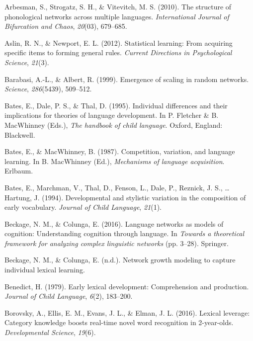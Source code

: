 \documentclass[english,,man,floatsintext]{apa6}
\begin{document}
\leavevmode\hypertarget{ref-arbesman2010}{}%
Arbesman, S., Strogatz, S. H., \& Vitevitch, M. S. (2010). The structure of phonological networks across multiple languages. \emph{International Journal of Bifurcation and Chaos}, \emph{20}(03), 679--685.

\leavevmode\hypertarget{ref-aslin2012}{}%
Aslin, R. N., \& Newport, E. L. (2012). Statistical learning: From acquiring specific items to forming general rules. \emph{Current Directions in Psychological Science}, \emph{21}(3).

\leavevmode\hypertarget{ref-barabasi99}{}%
Barabasi, A.-L., \& Albert, R. (1999). Emergence of scaling in random networks. \emph{Science}, \emph{286}(5439), 509--512.

\leavevmode\hypertarget{ref-bates1995}{}%
Bates, E., Dale, P. S., \& Thal, D. (1995). Individual differences and their implications for theories of language development. In P. Fletcher \& B. MacWhinney (Eds.), \emph{The handbook of child language}. Oxford, England: Blackwell.

\leavevmode\hypertarget{ref-bates1987}{}%
Bates, E., \& MacWhinney, B. (1987). Competition, variation, and language learning. In B. MacWhinney (Ed.), \emph{Mechanisms of language acquisition}. Erlbaum.

\leavevmode\hypertarget{ref-bates1994}{}%
Bates, E., Marchman, V., Thal, D., Fenson, L., Dale, P., Reznick, J. S., \ldots{} Hartung, J. (1994). Developmental and stylistic variation in the composition of early vocabulary. \emph{Journal of Child Language}, \emph{21}(1).

\leavevmode\hypertarget{ref-beckage2016}{}%
Beckage, N. M., \& Colunga, E. (2016). Language networks as models of cognition: Understanding cognition through language. In \emph{Towards a theoretical framework for analyzing complex linguistic networks} (pp. 3--28). Springer.

\leavevmode\hypertarget{ref-beckage}{}%
Beckage, N. M., \& Colunga, E. (n.d.). Network growth modeling to capture individual lexical learning.

\leavevmode\hypertarget{ref-benedict1979}{}%
Benedict, H. (1979). Early lexical development: Comprehension and production. \emph{Journal of Child Language}, \emph{6}(2), 183--200.

\leavevmode\hypertarget{ref-borovsky2016}{}%
Borovsky, A., Ellis, E. M., Evans, J. L., \& Elman, J. L. (2016). Lexical leverage: Category knowledge boosts real-time novel word recognition in 2-year-olds. \emph{Developmental Science}, \emph{19}(6).
\end{document}
